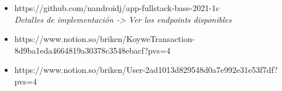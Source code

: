\begin{itemize}

  \item https://github.com/nandroidj/app-fullstack-base-2021-1c
    \\ \textit{Detalles de implementación -> Ver los endpoints disponibles}

  \item https://www.notion.so/briken/KoyweTransaction-8d9ba1eda4664819a30378c3548ebacf?pvs=4

  \item https://www.notion.so/briken/User-2ad1013d829548d0a7e992e31e53f7df?pvs=4

\end{itemize}



















